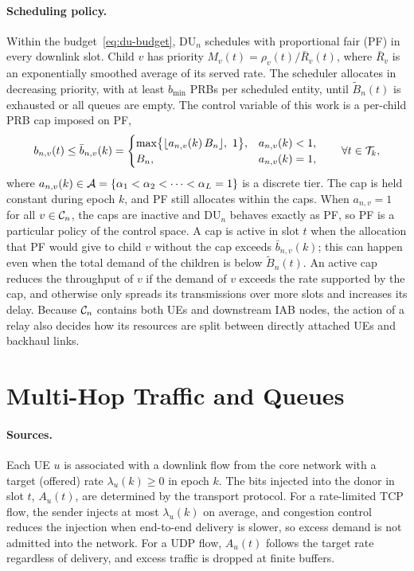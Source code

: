 \begin{EnChapter}
\paragraph{Scheduling policy.}
Within the budget~\eqref{eq:du-budget}, DU$_n$ schedules with proportional fair (PF)
in every downlink slot. Child $v$ has priority $M_v(t) = \rho_v(t) / \bar R_v(t)$,
where $\bar R_v$ is an exponentially smoothed average of its served rate. The
scheduler allocates in decreasing priority, with at least $b_{\min}$ PRBs per
scheduled entity, until $\tilde B_n(t)$ is exhausted or all queues are empty. The
control variable of this work is a per-child PRB cap imposed on PF,
\begin{equation}
  b_{n,v}(t) \le \bar b_{n,v}(k) =
  \begin{cases}
    \max\bigl\{ \lfloor a_{n,v}(k)\, B_n \rfloor,\ 1 \bigr\}, & a_{n,v}(k) < 1, \\
    B_n, & a_{n,v}(k) = 1,
  \end{cases}
  \qquad \forall t \in \mathcal{T}_k,
  \label{eq:cap}
\end{equation}
where $a_{n,v}(k) \in \mathcal{A} = \{\alpha_1 < \alpha_2 < \dots < \alpha_L = 1\}$ is a
discrete tier. The cap is held constant during epoch $k$, and PF still allocates
within the caps. When $a_{n,v} = 1$ for all $v \in \mathcal{C}_n$, the caps are inactive
and DU$_n$ behaves exactly as PF, so PF is a particular policy of the control space.
A cap is active in slot $t$ when the allocation that PF would give to child $v$
without the cap exceeds $\bar b_{n,v}(k)$; this can happen even when the total demand
of the children is below $\tilde B_n(t)$. An active cap reduces the throughput of $v$
if the demand of $v$ exceeds the rate supported by the cap, and otherwise only
spreads its transmissions over more slots and increases its delay. Because $\mathcal{C}_n$ contains both UEs and downstream IAB nodes, the
action of a relay also decides how its resources are split between directly
attached UEs and backhaul links.

\section{Multi-Hop Traffic and Queues}
\label{subsec:traffic}

\paragraph{Sources.}
Each UE $u$ is associated with a downlink flow from the core network with a
target (offered) rate $\lambda_u(k) \ge 0$ in epoch $k$. The bits injected into
the donor in slot $t$, $A_u(t)$, are determined by the transport protocol. For a
rate-limited TCP flow, the sender injects at most $\lambda_u(k)$ on average, and
congestion control reduces the injection when end-to-end delivery is slower, so
excess demand is not admitted into the network. For a UDP flow, $A_u(t)$ follows
the target rate regardless of delivery, and excess traffic is dropped at finite
buffers.


\end{EnChapter}
